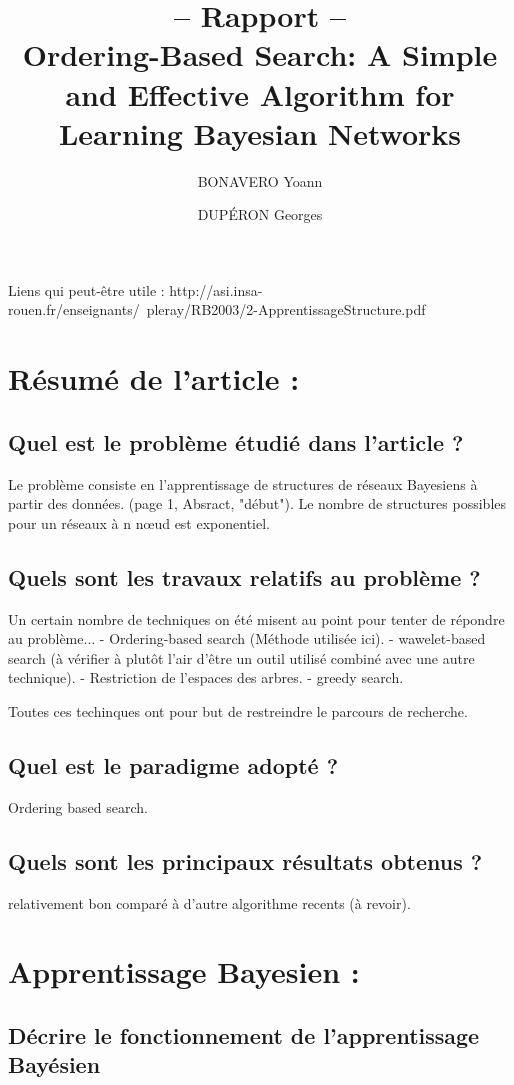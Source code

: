 \documentclass[french,a4paper]{article}
\title{-- Rapport -- \\ Ordering-Based Search: A Simple and Effective Algorithm for Learning Bayesian Networks}
\author{BONAVERO Yoann \and DUPÉRON Georges}
\begin{document}
\maketitle
\newpage

Liens qui peut-être utile : 
http://asi.insa-rouen.fr/enseignants/~pleray/RB2003/2-ApprentissageStructure.pdf

\section{Résumé de l’article :}
\subsection{Quel est le problème étudié dans l’article ?}
Le problème consiste en l'apprentissage de structures de réseaux Bayesiens à partir des données.
(page 1, Absract, "début").
Le nombre de structures possibles pour un réseaux à n nœud est exponentiel.
\subsection{Quels sont les travaux relatifs au problème ? }
Un certain nombre de techniques on été misent au point pour tenter de répondre au problème...
- Ordering-based search (Méthode utilisée ici).
- wawelet-based search (à vérifier à plutôt l'air d'être un outil utilisé combiné avec une autre technique).
- Restriction de l'espaces des arbres.
- greedy search.

Toutes ces techinques ont pour but de restreindre le parcours de recherche.

\subsection{Quel est le paradigme adopté ?}
Ordering based search.
\subsection{Quels sont les principaux résultats obtenus ?}
relativement bon comparé à d'autre algorithme recents (à revoir).

\section{Apprentissage Bayesien :}
\subsection{Décrire le fonctionnement de l'apprentissage Bayésien}
\end{document}
